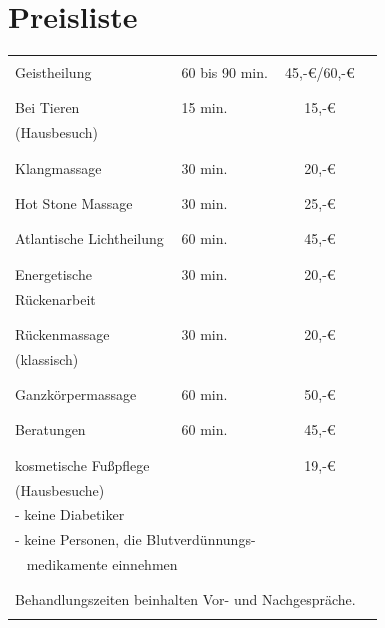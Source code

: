 \documentclass[10pt,foldmark,notumble]{leaflet}
\begin{document}
\section{Preisliste}
\begin{tabular}{p{35mm}lcr}%
\\
\hline
\\
Geistheilung &   60 bis 90 min. & 45,-€/60,-€   \\
\\
\hline
\\
Bei Tieren   & 15 min. &  15,-€ \\
(Hausbesuch) & & \\
\\
\hline
\\
Klangmassage   & 30 min. &  20,-€ \\
\\
\hline
\\
Hot Stone Massage   & 30 min. & 25,-€   \\
\\
\hline 
\\
Atlantische Lichtheilung  & 60 min. &  45,-€ \\
\\
\hline
\\
Energetische  & 30 min. &  20,-€ \\
Rückenarbeit& &\\
\\
\hline
\\
Rückenmassage   & 30 min. & 20,-€ \\
(klassisch)& &\\
\\
\hline
\\
Ganzkörpermassage & 60 min. & 50,-€ \\
\\
\hline
\\
Beratungen & 60 min. & 45,-€ \\
\\
\hline
\\
kosmetische Fußpflege & & 19,-€\\
(Hausbesuche) & & \\
\multicolumn{2}{l}{- keine Diabetiker }\\
\multicolumn{2}{l}{- keine Personen, die Blutverdünnungs-}\\
\multicolumn{2}{l}{~ medikamente einnehmen}\\
\\
\hline
\\
\multicolumn{3}{l}{Behandlungszeiten beinhalten Vor- und Nachgespräche.}\\
\\
\hline
\end{tabular} %
\end{document}

